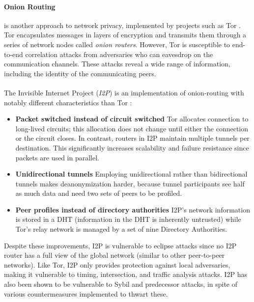 \paragraph{Onion Routing} is another approach to network privacy, implemented by projects such as Tor \cite{tor}. Tor encapsulates messages in layers of
encryption and transmits them through a series of network nodes called \textit{onion routers}. However, Tor is susceptible to end-to-end correlation attacks from adversaries who can eavesdrop on the communication channels. These attacks reveal a wide range of information, including the identity of the communicating peers.
\\~\\The Invisible Internet Project (\textit{I2P}) is an implementation of onion-routing with notably different characteristics than Tor \cite{i2p}:

\begin{itemize}

    \item \textbf{Packet switched instead of circuit switched} Tor allocates connection
        to long-lived circuits; this allocation does not change until either the
        connection or the circuit closes. In contrast, routers in I2P maintain
        multiple tunnels per destination. This significantly increases
        scalability and failure resistance since packets are used in
        parallel.

    \item \textbf{Unidirectional tunnels} Employing unidirectional rather than bidirectional tunnels makes
        deanonymization harder, because tunnel participants see half as much data
        and need two sets of peers to be profiled.

    \item \textbf{Peer profiles instead of directory authorities} I2P’s network
        information is stored in a DHT (information in the DHT is inherently
        untrusted) while Tor’s relay network is managed by a set of nine
        Directory Authorities.

\end{itemize}
Despite these improvements, I2P is vulnerable to eclipse attacks since no I2P router has a full view of the
global network (similar to other peer-to-peer networks). Like Tor, I2P only provides protection
against local adversaries, making it vulnerable to timing,
intersection, and traffic analysis attacks. I2P has also been shown to be vulnerable
to Sybil and predecessor attacks, in spite of various countermeasures
implemented to thwart these.

